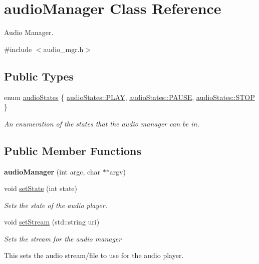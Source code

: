\hypertarget{classaudio_manager}{}\section{audio\+Manager Class Reference}
\label{classaudio_manager}


Audio Manager.  




{\ttfamily \#include $<$audio\+\_\+mgr.\+h$>$}

\subsection*{Public Types}
\begin{DoxyCompactItemize}
\item 
enum \hyperlink{classaudio_manager_aa37cded78cf789d8931208a0c6494af2}{audio\+States} \{ \hyperlink{classaudio_manager_aa37cded78cf789d8931208a0c6494af2a6a216efc529825c60a4a4c0bc99ad77f}{audio\+States\+::\+P\+L\+A\+Y}, 
\hyperlink{classaudio_manager_aa37cded78cf789d8931208a0c6494af2a291554596c183e837f0a6bec3767c891}{audio\+States\+::\+P\+A\+U\+S\+E}, 
\hyperlink{classaudio_manager_aa37cded78cf789d8931208a0c6494af2a615a46af313786fc4e349f34118be111}{audio\+States\+::\+S\+T\+O\+P}
 \}\begin{DoxyCompactList}\small\item\em An enumeration of the states that the audio manager can be in. \end{DoxyCompactList}
\end{DoxyCompactItemize}
\subsection*{Public Member Functions}
\begin{DoxyCompactItemize}
\item 
\hypertarget{classaudio_manager_ac33c12e5070a2fb80fce9f231999995d}{}{\bfseries audio\+Manager} (int argc, char $\ast$$\ast$argv)\label{classaudio_manager_ac33c12e5070a2fb80fce9f231999995d}

\item 
void \hyperlink{classaudio_manager_a27cdb7486e1793df14a42fed62aaf673}{set\+State} (int state)
\begin{DoxyCompactList}\small\item\em Sets the state of the audio player. \end{DoxyCompactList}\item 
void \hyperlink{classaudio_manager_ae8e0e3c82b018fda14157b1169bf76e3}{set\+Stream} (std\+::string uri)
\begin{DoxyCompactList}\small\item\em Sets the stream for the audio manager
\begin{DoxyItemize}
\item This sets the audio stream/file to use for the audio player. 
\end{DoxyItemize}\end{DoxyCompactList}\end{DoxyCompactItemize}


